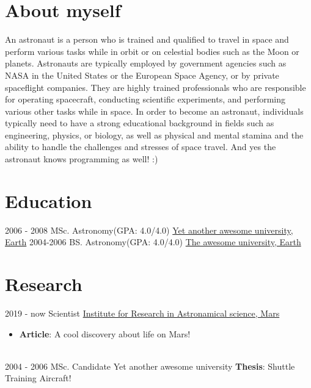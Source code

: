 \initcv
\makeprofile 
\section*{About myself}
An astronaut is a person who is trained and qualified to travel in space and perform various tasks while in orbit or on celestial bodies such as the Moon or planets. Astronauts are typically employed by government agencies such as NASA in the United States or the European Space Agency, or by private spaceflight companies. They are highly trained professionals who are responsible for operating spacecraft, conducting scientific experiments, and performing various other tasks while in space. In order to become an astronaut, individuals typically need to have a strong educational background in fields such as engineering, physics, or biology, as well as physical and mental stamina and the ability to handle the challenges and stresses of space travel. And yes the astronaut knows programming as well! :)


\section*{Education}

\begin{twenty} %
	\twentyitem
	{2006 - 2008}
	{}
	{MSc. Astronomy\textnormal{(GPA: 4.0/4.0)}}
	{\href{http://www.astronomy.com/}{Yet another awesome university, Earth}}
	{}
	{}
	\twentyitem
	{2004-2006}
	{}
	{BS. Astronomy\textnormal{(GPA: 4.0/4.0)}}
	{\href{http://www.astronomy.com/}{The awesome university, Earth}}
	{}
	{}
\end{twenty}


\section*{Research}
\begin{twenty}
	\twentyitem
	{2019 - now}
	{}
	{Scientist}
	{\href{http://www.astronomy.com/}{Institute for Research in Astronamical science, Mars}}
	{}
	{
		{\begin{itemize}
				\item \textbf{Article}: A cool discovery about life on Mars!  
		\end{itemize}}
	} \\

	\twentyitem
	{2004 - 2006}
	{}
	{MSc. Candidate}
	{{Yet another awesome university}}
	{}
	{
		\textbf{Thesis}: Shuttle Training Aircraft!
	}
\end{twenty}


